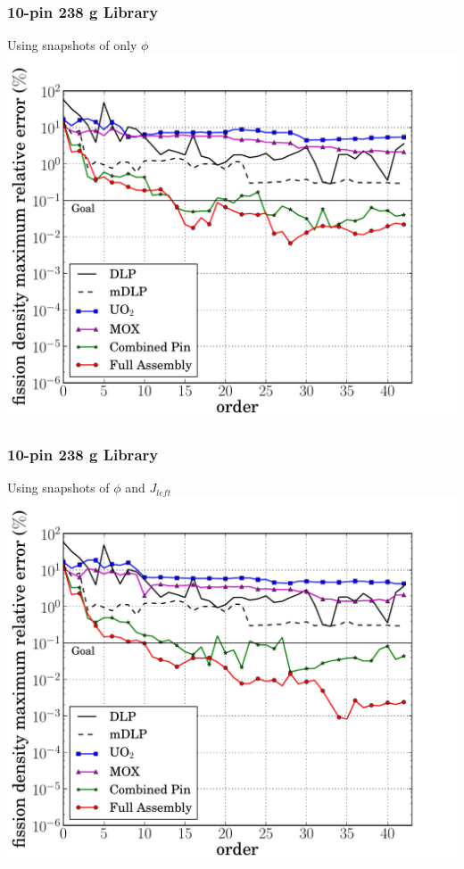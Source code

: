 \documentclass[fleqn]{beamer}
\begin{document}
  \begin{frame}
    \frametitle{10-pin 238 g Library}
    \begin{center}
    Using snapshots of only $\phi$
    \includegraphics[trim=.1cm .25cm 2.0cm .4cm, clip=true, totalheight=.8\textheight]{10pin_238_energy_basis_comparison_fission-44}
    \end{center}
  \end{frame}

  \begin{frame}
    \frametitle{10-pin 238 g Library}
    \begin{center}
    Using snapshots of $\phi$ and $J_{left}$
    \includegraphics[trim=.1cm .25cm 2.0cm .4cm, clip=true, totalheight=.8\textheight]{10pin_238_partial_energy_basis_comparison_fission-44}
    \end{center}
  \end{frame}
\end{document}
